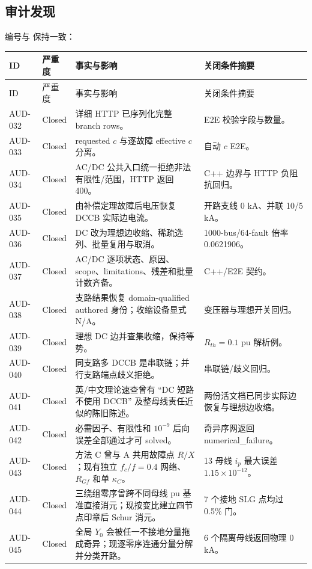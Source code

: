 \subsection{审计发现}

编号与  保持一致：
\begin{center}\footnotesize
\begin{longtable}{@{}L{1.5cm}L{1.5cm}L{8.1cm}L{3.1cm}@{}}
\toprule
ID & 严重度 & 事实与影响 & 关闭条件摘要\\
\midrule
\endfirsthead
\toprule
ID & 严重度 & 事实与影响 & 关闭条件摘要\\
\midrule
\endhead
AUD-032 & Closed & 详细 HTTP 已序列化完整 branch rows。 & E2E 校验字段与数量。\\
AUD-033 & Closed & requested $c$ 与逐故障 effective $c$ 分离。 & 自动 $c$ E2E。\\
AUD-034 & Closed & AC/DC 公共入口统一拒绝非法有限性/范围，HTTP 返回 400。 & C++ 边界与 HTTP 负阻抗回归。\\
AUD-035 & Closed & 由补偿定理故障后电压恢复 DCCB 实际边电流。 & 开路支线 0 kA、并联 10/5 kA。\\
AUD-036 & Closed & DC 改为理想边收缩、稀疏选列、批量复用与取消。 & 1000-bus/64-fault 倍率 0.0621906。\\
AUD-037 & Closed & AC/DC 逐项状态、原因、scope、limitations、残差和批量计数齐备。 & C++/E2E 契约。\\
AUD-038 & Closed & 支路结果恢复 domain-qualified authored 身份；收缩设备显式 N/A。 & 变压器与理想开关回归。\\
AUD-039 & Closed & 理想 DC 边并查集收缩，保持等势。 & $R_{th}=0.1$ pu 解析例。\\
AUD-040 & Closed & 同支路多 DCCB 是串联链；并行支路端点歧义拒绝。 & 串联链/歧义回归。\\
AUD-041 & Closed & 英/中文理论速查曾有 ``DC 短路不使用 DCCB'' 及整母线责任近似的陈旧陈述。 & 两份活文档已同步实际边恢复与理想边收缩。\\
AUD-042 & Closed & 必需因子、有限性和 $10^{-9}$ 后向误差全部通过才可 solved。 & 奇异序网返回 numerical\_failure。\\
AUD-043 & Closed & 方法 C 曾与 A 共用故障点 $R/X$；现有独立 $f_c/f=0.4$ 网络、$R_{Gf}$ 和单 $\kappa_C$。 & 13 母线 $i_p$ 最大误差 $1.15\times10^{-12}$。\\
AUD-044 & Closed & 三绕组零序曾跨不同母线 pu 基准直接消元；现按变比建立四节点印章后 Schur 消元。 & 7 个接地 SLG 点均过 0.5\% 门。\\
AUD-045 & Closed & 全局 $Y_0$ 会被任一不接地分量拖成奇异；现逐零序连通分量分解并分类开路。 & 6 个隔离母线返回物理 0 kA。\\

\end{longtable}
\end{center}
